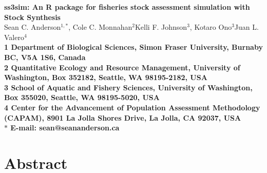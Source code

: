 \documentclass[10pt]{article}
\date{}
\providecommand{\DIFadd}[1]{{\protect\color{blue}\uwave{#1}}} %
\providecommand{\DIFaddbegin}{} %
\providecommand{\DIFaddend}{} %
\providecommand{\DIFdelbegin}{} %
\providecommand{\DIFdelend}{} %
\begin{document}
\begin{flushleft}
{\Large
\textbf{ss3sim: An R package for fisheries stock assessment simulation with Stock Synthesis}
}
\\
Sean C. Anderson$^{1,\ast}$,
Cole C. Monnahan$^{2}$\DIFaddbegin \DIFadd{,
}\DIFaddend Kelli F. Johnson$^{3}$,
Kotaro Ono$^{3}$\DIFaddbegin \DIFadd{,
}\DIFaddend Juan L. Valero$^{4}$
\\
\bf{1} Department of Biological Sciences,
Simon Fraser University,
Burnaby BC, V5A 1S6, Canada
\\
\bf{2} Quantitative Ecology and Resource Management,
University of Washington, Box 352182,
Seattle, WA 98195-2182, USA
\\
\bf{3} School of Aquatic and Fishery Sciences,
University of Washington, Box 355020,
Seattle, WA 98195-5020, USA
\\
\bf{4} Center for the Advancement of Population Assessment Methodology
(CAPAM), 8901 La Jolla Shores Drive, La Jolla, CA 92037, USA
\\
$\ast$ E-mail: sean@seananderson.ca
\end{flushleft}


\linenumbers
\DIFdelbegin %
\DIFdelend \DIFaddbegin \modulolinenumbers[1]
\DIFaddend

\section*{Abstract}
\end{document}

